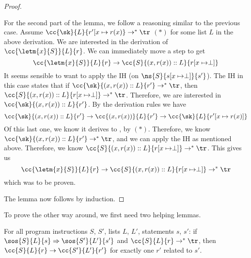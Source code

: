 \begin{proof}
\begin{itemize}[noitemsep]
    For the second part of the lemma, we follow a reasoning similar to the previous case. 
    Assume $\cc{\sk}{L}{r'[x\mapsto r(x)} \to ^{*} \tr$ $( * )$ for some list $L$ in the above derivation. We are interested in the derivation of $\cc{\letm{x}{S}}{L}{r}$. We can immediately move a step to get
    $$\cc{\letm{x}{S}}{L}{r} \to \cc{S}{(x,r(x))::L}{r[x\mapsto \perp]}$$
    It seems sensible to want to apply the IH (on $\ns{S}{s[x\mapsto \perp]}{s'}$). The IH in this case states that if $\cc{\sk}{(x,r(x))::L}{r'} \to^{*} \tr$, then $\cc{S}{(x,r(x))::L}{r[x\mapsto \perp]} \to^{*} \tr$. Therefore, we are interested in $\cc{\sk}{(x,r(x))::L}{r'}$. By the derivation rules we have
    $$\cc{\sk}{(x,r(x))::L}{r'} \to \cc{(x,r(x))}{L}{r'} \to \cc{\sk}{L}{r'[x \mapsto r(x)]}$$
    Of this last one, we know it derives to \tr, by $( * )$. Therefore, we know $\cc{\sk}{(x,r(x))::L}{r'} \to^{*} \tr$, and we can apply the IH as mentioned above. Therefore, we know $\cc{S}{(x,r(x))::L}{r[x\mapsto \perp]} \to^{*} \tr$. This gives us
    $$\cc{\letm{x}{S}}{L}{r} \to \cc{S}{(x,r(x))::L}{r[x\mapsto \perp]} \to ^{*} \tr$$
    which was to be proven.
\end{itemize}
The lemma now follows by induction. 
\end{proof}

To prove the other way around, we first need two helping lemmas. 

\begin{lemma}
\label{relationsosccstep}
For all program instructions $S$, $S'$, lists $L$, $L'$, statements $s$, $s'$: if $\sos{S}{L}{s} \Rightarrow  \sos{S'}{L'}{s'}$ and $\cc{S}{L}{r} \to ^{*} \tr$, then $\cc{S}{L}{r} \to \cc{S'}{L'}{r'}$ for exactly one $r'$ related to $s'$. 
\end{lemma}

